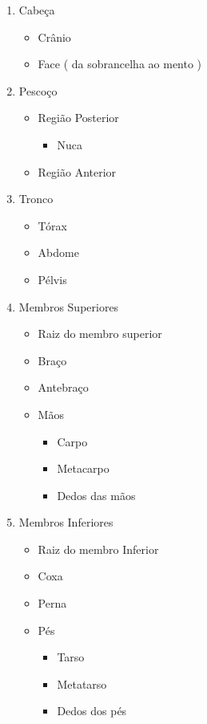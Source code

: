 \documentclass[
]{book}
\providecommand{\tightlist}{%
  \setlength{\itemsep}{0pt}\setlength{\parskip}{0pt}}
\begin{document}
\begin{enumerate}
\def\labelenumi{\arabic{enumi}.}
\tightlist
\item
  Cabeça

  \begin{itemize}
  \tightlist
  \item
    Crânio
  \item
    Face ( da sobrancelha ao mento )
  \end{itemize}
\item
  Pescoço

  \begin{itemize}
  \tightlist
  \item
    Região Posterior

    \begin{itemize}
    \tightlist
    \item
      Nuca
    \end{itemize}
  \item
    Região Anterior
  \end{itemize}
\item
  Tronco

  \begin{itemize}
  \tightlist
  \item
    Tórax
  \item
    Abdome
  \item
    Pélvis
  \end{itemize}
\item
  Membros Superiores

  \begin{itemize}
  \tightlist
  \item
    Raiz do membro superior
  \item
    Braço
  \item
    Antebraço
  \item
    Mãos

    \begin{itemize}
    \tightlist
    \item
      Carpo
    \item
      Metacarpo
    \item
      Dedos das mãos
    \end{itemize}
  \end{itemize}
\item
  Membros Inferiores

  \begin{itemize}
  \tightlist
  \item
    Raiz do membro Inferior
  \item
    Coxa
  \item
    Perna
  \item
    Pés

    \begin{itemize}
    \tightlist
    \item
      Tarso
    \item
      Metatarso
    \item
      Dedos dos pés
    \end{itemize}
  \end{itemize}
\end{enumerate}
\end{document}
